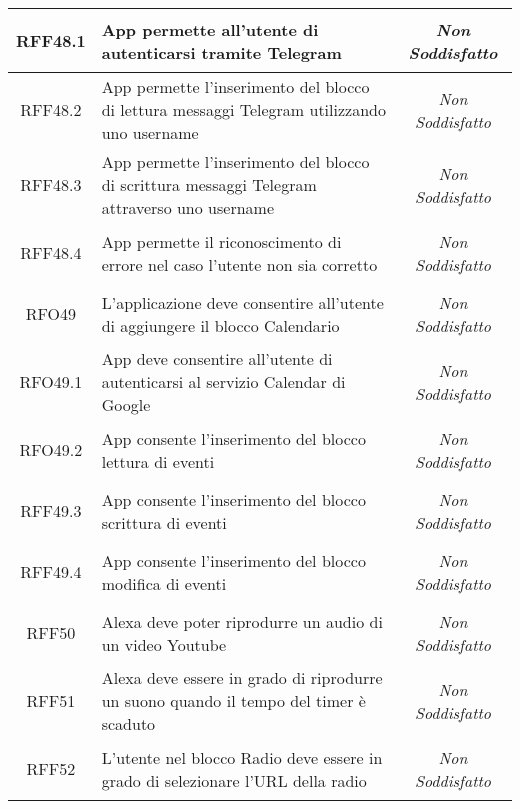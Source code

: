 \begin{longtable}{|c|>{\centering}m{7cm}|c|}
	\hypertarget{RFF48.1}{RFF48.1} & App permette all'utente di autenticarsi tramite Telegram & \textit{Non Soddisfatto}\\ \hline
	
	\hypertarget{RFF48.2}{RFF48.2} & App permette l'inserimento del blocco di lettura messaggi Telegram utilizzando uno username & \textit{Non Soddisfatto}\\ \hline
	
	\hypertarget{RFF48.3}{RFF48.3} & App permette l'inserimento del blocco di scrittura messaggi Telegram attraverso uno username & \textit{Non Soddisfatto}\\ \hline
	
	\hypertarget{RFF48.4}{RFF48.4} & App permette il riconoscimento di errore nel caso l'utente non sia corretto & \textit{Non Soddisfatto}\\ \hline
	
	\hypertarget{RFO49}{RFO49} & L'applicazione deve consentire all'utente di aggiungere il blocco Calendario & \textit{Non Soddisfatto}\\ \hline
	
	\hypertarget{RFO49.1}{RFO49.1} & App deve consentire all'utente di autenticarsi al servizio Calendar di Google & \textit{Non Soddisfatto}\\ \hline
	
	\hypertarget{RFO49.2}{RFO49.2} & App consente l'inserimento del blocco lettura di eventi  & \textit{Non Soddisfatto}\\ \hline
	
	\hypertarget{RFF49.3}{RFF49.3} & App consente l'inserimento del blocco scrittura di eventi & \textit{Non Soddisfatto}\\ \hline
	
	\hypertarget{RFF49.4}{RFF49.4} & App consente l'inserimento del blocco modifica di eventi & \textit{Non Soddisfatto}\\ \hline
	
	\hypertarget{RFF50}{RFF50} & Alexa deve poter riprodurre un audio di un video Youtube & \textit{Non Soddisfatto}\\ \hline
	
	\hypertarget{RFF51}{RFF51} & Alexa deve essere in grado di riprodurre un suono quando il tempo del timer è scaduto & \textit{Non Soddisfatto}\\ \hline
	
	\hypertarget{RFF52}{RFF52} & L'utente nel blocco Radio deve essere in grado di selezionare l'URL della radio & \textit{Non Soddisfatto}\\ \hline
	

\end{longtable}
